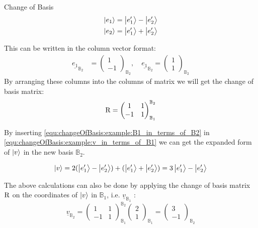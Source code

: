\begin{example}{Change of Basis}
	\begin{equation}
		\begin{split}
			\ket{e_1} &= \ket{e'_1} - \ket{e'_2} \\
			\ket{e_2} &= \ket{e'_1} + \ket{e'_2} 
		\end{split}
		\label{equ:changeOfBasis:example:B1_in_terms_of_B2}
	\end{equation}

	This can be written in the column vector format:
	\begin{align*}
		\underline{e_1}_{\mathbb{B}_2} &= \begin{pmatrix}
			1 \\
			-1
		\end{pmatrix}_{\mathbb{B}_2} , \quad
		\underline{e_1}_{\mathbb{B}_2} = \begin{pmatrix}
			1 \\
			1
		\end{pmatrix}_{\mathbb{B}_2}
	\end{align*}
	By arranging these columns into the columns of matrix we will get the change of basis matrix:
	\begin{equation*}
		\operatorname{R} = \begin{pmatrix}
			1 & 1 \\
			-1 & 1
		\end{pmatrix}_{\mathbb{B}_1}^{\mathbb{B}_2}
	\end{equation*}

	By inserting \ref{equ:changeOfBasis:example:B1_in_terms_of_B2} in \ref{equ:changeOfBasis:example:v_in_terms_of_B1} we can get the expanded form of $ \ket{v} $ in the new basis $\mathbb{B}_2$.
	
	\begin{equation*}
		\ket{v} = 2 (\ket{e'_1} - \ket{e'_2}) + (\ket{e'_1} + \ket{e'_2} ) = 3 \ket{e'_1} -\ket{e'_2} 
	\end{equation*}

	The above calculations can also be done by applying the change of basis matrix $ \operatorname{R} $ on the coordinates of $ \ket{v} $ in $ \mathbb{B}_1 $, i.e. $ \underline{v}_{\mathbb{B}_1} $ :
	\begin{equation*}
		\underline{v}_{\mathbb{B}_2} = \begin{pmatrix}
			1 & 1 \\
			-1 & 1
		\end{pmatrix}_{\mathbb{B}_1}^{\mathbb{B}_2}
		\begin{pmatrix}
			2 \\
			1
		\end{pmatrix}_{\mathbb{B}_1} = 
	\begin{pmatrix}
		3 \\
		-1
	\end{pmatrix}_{\mathbb{B}_2}
	\end{equation*}
\end{example}


